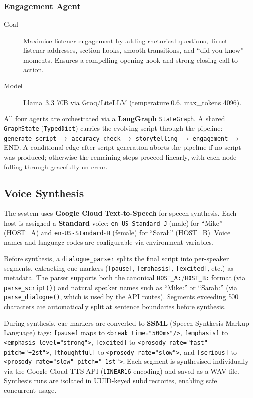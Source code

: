 \documentclass[sigconf,natbib=false]{acmart}   %
\begin{document}
\subsubsection{Engagement Agent}
\begin{description}
  \item[Goal] Maximise listener engagement by adding rhetorical questions, direct listener addresses, section hooks, smooth transitions, and ``did you know'' moments.  Ensures a compelling opening hook and strong closing call-to-action.
  \item[Model] Llama~3.3 70B via Groq/LiteLLM (temperature 0.6, max\_tokens 4096).
\end{description}

All four agents are orchestrated via a \textbf{LangGraph} \texttt{StateGraph}.  A shared \texttt{GraphState} (\texttt{TypedDict}) carries the evolving script through the pipeline: \texttt{generate\_script} $\to$ \texttt{accuracy\_check} $\to$ \texttt{storytelling} $\to$ \texttt{engagement} $\to$ END.  A conditional edge after script generation aborts the pipeline if no script was produced; otherwise the remaining steps proceed linearly, with each node falling through gracefully on error.

\subsection{Voice Synthesis}
The system uses \textbf{Google Cloud Text-to-Speech} \cite{GoogleCloudTTS2024} for speech synthesis.  Each host is assigned a \textbf{Standard} voice: \texttt{en-US-Standard-J} (male) for ``Mike'' (HOST\_A) and \texttt{en-US-Standard-H} (female) for ``Sarah'' (HOST\_B).  Voice names and language codes are configurable via environment variables.

Before synthesis, a \texttt{dialogue\_parser} splits the final script into per-speaker segments, extracting cue markers (\texttt{[pause]}, \texttt{[emphasis]}, \texttt{[excited]}, etc.) as metadata.  The parser supports both the canonical \texttt{HOST\_A:}/\texttt{HOST\_B:} format (via \texttt{parse\_script()}) and natural speaker names such as ``Mike:'' or ``Sarah:'' (via \texttt{parse\_dialogue()}, which is used by the API routes).  Segments exceeding 500 characters are automatically split at sentence boundaries before synthesis.

During synthesis, cue markers are converted to \textbf{SSML} (Speech Synthesis Markup Language) tags: \texttt{[pause]} maps to \texttt{<break time="500ms"/>}, \texttt{[emphasis]} to \texttt{<emphasis level="strong">}, \texttt{[excited]} to \texttt{<prosody rate="fast" pitch="+2st">}, \texttt{[thoughtful]} to \texttt{<prosody rate="slow">}, and \texttt{[serious]} to \texttt{<prosody rate="slow" pitch="-1st">}.  Each segment is synthesised individually via the Google Cloud TTS API (\texttt{LINEAR16} encoding) and saved as a WAV file.  Synthesis runs are isolated in UUID-keyed subdirectories, enabling safe concurrent usage.
\end{document}
